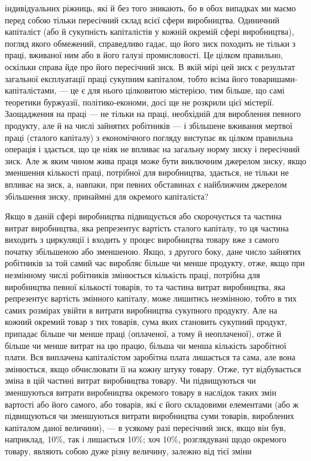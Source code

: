 \parcont{}  %
індивідуальних ріжниць, які й без того зникають, бо в обох
випадках ми маємо перед собою тільки пересічний склад всієї
сфери виробництва. Одиничний капіталіст (або й сукупність капіталістів у кожній окремій сфері
виробництва), погляд якого
обмежений, справедливо гадає, що його зиск походить не тільки
з праці, вживаної ним або в його галузі промисловості. Це цілком правильно, оскільки справа йде про
його пересічний зиск.
В якій мірі цей зиск є результат загальної експлуатації праці
сукупним капіталом, тобто всіма його товаришами-капіталістами, — це є для нього цілковитою
містерією, тим більше, що самі теоретики буржуазії, політико-економи, досі ще не розкрили цієї
містерії. Заощадження на праці — не тільки на праці, необхідній
для вироблення певного продукту, але й на числі зайнятих робітників — і збільшене вживання мертвої
праці (сталого капіталу)
з економічного погляду виступає як цілком правильна операція і здається, що це ніяк не впливає на
загальну норму
зиску і пересічний зиск. Але ж яким чином жива праця може
бути виключним джерелом зиску, якщо зменшення кількості
праці, потрібної для виробництва, здається, не тільки не впливає на зиск, а, навпаки, при певних
обставинах є найближчим
джерелом збільшення зиску, принаймні для окремого капіталіста?

Якщо в даній сфері виробництва підвищується або скорочується та частина витрат виробництва, яка
репрезентує вартість
сталого капіталу, то ця частина виходить з циркуляції і входить
у процес виробництва товару вже з самого початку збільшеною або зменшеною. Якщо, з другого боку,
дане число зайнятих робітників за той самий час виробляє більше чи менше продукту, отже, якщо при
незмінному числі робітників змінюється кількість праці, потрібна для виробництва певної кількості
товарів, то та частина витрат виробництва, яка репрезентує вартість змінного капіталу, може лишитись
незмінною,
тобто в тих самих розмірах увійти в витрати виробництва сукупного продукту. Але на кожний окремий
товар з тих товарів, сума яких становить сукупний продукт, припадає більше чи менше праці
(оплаченої, а тому й неоплаченої), отже й більше
чи менше витрат на цю працю, більша чи менша кількість заробітної плати. Вся виплачена капіталістом
заробітна плата лишається та сама, але вона змінюється, якщо обчислювати її на кожну штуку товару.
Отже, тут відбувається зміна в цій частині
витрат виробництва товару. Чи підвищуються чи зменшуються витрати виробництва окремого товару в
наслідок таких змін вартості
або його самого, або товарів, які є його складовими елементами
(або ж підвищуються чи зменшуються витрати виробництва суми
товарів, вироблених капіталом даної величини), — в усякому
разі пересічний зиск, якщо він був, наприклад, 10\%, так і лишається 10\%; хоч 10\%, розглядувані щодо
окремого товару,
являють собою дуже різну величину, залежно від тієї зміни
\parbreak{}  %
